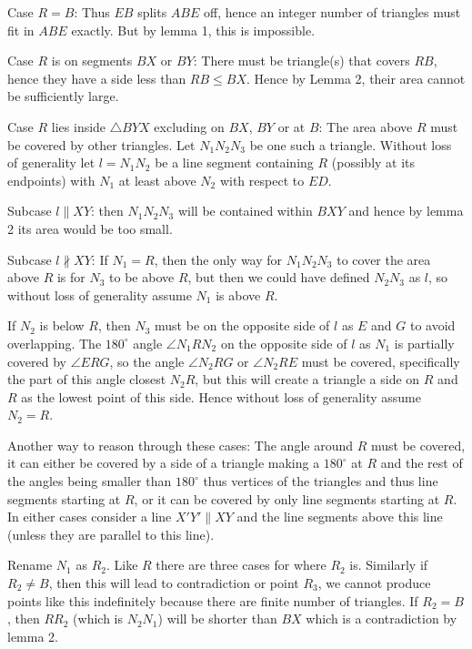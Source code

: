 \documentclass[12pt]{article}
\begin{document}
\begin{enumerate}[topsep=\bigskipamount,itemsep=\bigskipamount,leftmargin=0pt]
Case $R=B$: Thus $EB$ splits $ABE$ off,
hence an integer number of triangles must fit in $ABE$ exactly.
But by lemma 1, this is impossible.

Case $R$ is on segments $BX$ or $BY$:
There must be triangle(s) that covers $RB$,
hence they have a side less than $RB \leq BX$.
Hence by Lemma 2, their area cannot be sufficiently large.

Case $R$ lies inside $\triangle BYX$ excluding on $BX$, $BY$ or at $B$:
The area above $R$ must be covered
by other triangles.
Let $N_1 N_2 N_3$ be one such a triangle.
Without loss of generality let $l=N_1 N_2$ be a line segment containing $R$ (possibly at its endpoints)
with $N_1$ at least above $N_2$ with respect to $ED$.

Subcase $l \parallel  XY$:
then $N_1 N_2 N_3$ will be contained within $BXY$ and hence by lemma 2 its area would be too small.

Subcase $l \not\parallel  XY$:
If $N_1 = R$,
then the only way for $N_1 N_2 N_3$ to cover the area above $R$ is for $N_3$ to be above $R$,
but then we could have defined $N_2 N_3$ as $l$,
so without loss of generality assume $N_1$ is above $R$.

If $N_2$ is below $R$, then $N_3$ must be on the opposite side of $l$ as $E$ and $G$ to avoid overlapping.
The $180^\circ$ angle $\angle N_1 R N_2$ on the opposite side of $l$ as $N_1$
is partially covered by $\angle ERG$,
so the angle $\angle N_2 R G$ or $\angle N_2 R E$
must be covered,
specifically the part of this angle closest $N_2 R$,
but this will create a triangle a side on $R$ and $R$ as the lowest point of this side.
Hence without loss of generality assume $N_2 = R$.

Another way to reason through these cases: 
The angle around $R$ must be covered, it can either be covered by a side of a triangle making a $180^\circ$ at $R$ and the rest of the angles being smaller than $180^\circ$ thus vertices of the triangles and thus line segments starting at $R$,
or it can be covered by only line segments starting at $R$.
In either cases consider a line $X'Y'\parallel XY$
and the line segments above this line
(unless they are parallel to this line).

Rename $N_1$ as $R_2$.
Like $R$ there are three cases for where $R_2$ is.
Similarly if $R_2\neq B$, then this will lead to contradiction or point $R_3$,
we cannot produce points like this indefinitely because there are finite number of triangles.
If $R_2 = B$, 
then $R R_2$ (which is $N_2 N_1$)
will be shorter than $BX$ which is a contradiction by lemma 2.


\end{enumerate}
\end{document}
